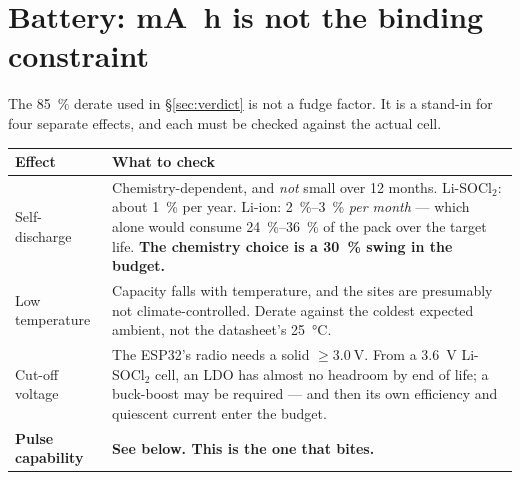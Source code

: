 \documentclass[11pt,a4paper]{article}
\begin{document}
\noindent
{}

\section{Battery: \si{\milli\ampere\hour} is not the binding constraint}
\label{sec:battery}

The \SI{85}{\percent} derate used in \S\ref{sec:verdict} is not a fudge factor. It is a stand-in
for four separate effects, and each must be checked against the actual cell.

\begin{center}
\begin{tabularx}{\textwidth}{lX}
\toprule
\textbf{Effect} & \textbf{What to check} \\
\midrule
Self-discharge & Chemistry-dependent, and \emph{not} small over 12 months. Li-SOCl$_2$: about \SI{1}{\percent} per year. Li-ion: \SIrange{2}{3}{\percent} \emph{per month} --- which alone would consume \SIrange{24}{36}{\percent} of the pack over the target life. \textbf{The chemistry choice is a \SI{30}{\percent} swing in the budget.} \\
Low temperature & Capacity falls with temperature, and the sites are presumably not climate-controlled. Derate against the coldest expected ambient, not the datasheet's \SI{25}{\celsius}. \\
Cut-off voltage & The ESP32's radio needs a solid $\geq\SI{3.0}{\volt}$. From a \SI{3.6}{\volt} Li-SOCl$_2$ cell, an LDO has almost no headroom by end of life; a buck-boost may be required --- and then its own efficiency and quiescent current enter the budget. \\
\midrule
\textbf{Pulse capability} & \textbf{See below. This is the one that bites.} \\
\bottomrule
\end{tabularx}
\end{center}
\end{document}

